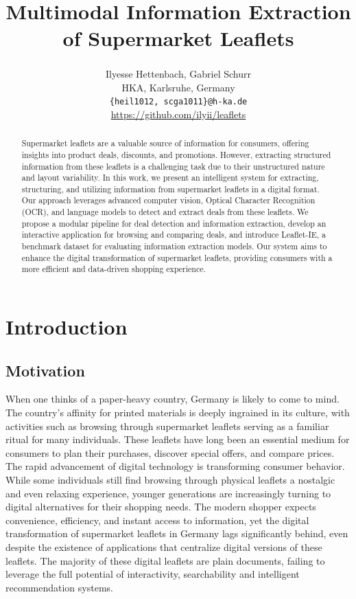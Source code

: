 \documentclass[11pt]{article}
\title{Multimodal Information Extraction of Supermarket Leaflets}
\author{Ilyesse Hettenbach\textsuperscript{}, Gabriel Schurr\textsuperscript{} \\
HKA, Karlsruhe, Germany \\
\texttt{\{heil1012, scga1011\}@h-ka.de} \\
\href{https://github.com/ilyii/leaflets}{https://github.com/ilyii/leaflets}
}
\begin{document}
\maketitle
\begin{abstract}
Supermarket leaflets are a valuable source of information for consumers, offering insights into product deals, discounts, and promotions. However, extracting structured information from these leaflets is a challenging task due to their unstructured nature and layout variability. In this work, we present an intelligent system for extracting, structuring, and utilizing information from supermarket leaflets in a digital format. Our approach leverages advanced computer vision, Optical Character Recognition (OCR), and language models to detect and extract deals from these leaflets. We propose a modular pipeline for deal detection and information extraction, develop an interactive application for browsing and comparing deals, and introduce Leaflet-IE, a benchmark dataset for evaluating information extraction models. Our system aims to enhance the digital transformation of supermarket leaflets, providing consumers with a more efficient and data-driven shopping experience.
\end{abstract}



\section{Introduction}

\subsection{Motivation}
When one thinks of a paper-heavy country, Germany is likely to come to mind. The country's affinity for printed materials is deeply ingrained in its culture, with activities such as browsing through supermarket leaflets serving as a familiar ritual for many individuals. These leaflets have long been an essential medium for consumers to plan their purchases, discover special offers, and compare prices.
The rapid advancement of digital technology is transforming consumer behavior. While some individuals still find browsing through physical leaflets a nostalgic and even relaxing experience, younger generations are increasingly turning to digital alternatives for their shopping needs. The modern shopper expects convenience, efficiency, and instant access to information, yet the digital transformation of supermarket leaflets in Germany lags significantly behind, even despite the existence of applications that centralize digital versions of these leaflets. The majority of these digital leaflets are plain documents, failing to leverage the full potential of interactivity, searchability and intelligent recommendation systems. 
\end{document}
